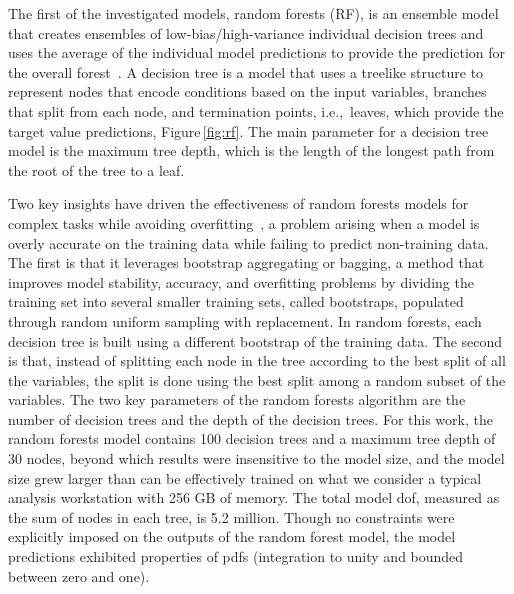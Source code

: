 \documentclass[review]{elsarticle}
\begin{document}
The first of the investigated models, random forests (RF), is an
ensemble model that creates ensembles of low-bias/high-variance
individual decision trees and uses the average of the individual model
predictions to provide the prediction for the overall
forest~\cite{Breiman2001}. A decision tree is a model that uses a
treelike structure to represent nodes that encode conditions based
on the input variables, branches that split from each node, and
termination points, i.e.,\ leaves, which provide the target value
predictions, Figure\,\ref{fig:rf}. The main parameter for a decision
tree model is the maximum tree depth, which is the length of the
longest path from the root of the tree to a leaf.

Two key insights have driven the effectiveness of random forests
models for complex tasks while avoiding
overfitting~\cite{Fernandez-Delgado2014,Liaw2002}, a problem arising
when a model is overly accurate on the training data while failing to
predict non-training data. The first is that it leverages bootstrap
aggregating or bagging, a method that improves model stability,
accuracy, and overfitting problems by dividing the training set into
several smaller training sets, called bootstraps, populated through
random uniform sampling with replacement. In random forests, each
decision tree is built using a different bootstrap of the training
data. The second is that, instead of splitting each node in the tree
according to the best split of all the variables, the split is done
using the best split among a random subset of the variables. The two
key parameters of the random forests algorithm are the number of
decision trees and the depth of the decision trees. For this work, the
random forests model contains 100 decision trees and a maximum tree
depth of 30 nodes, beyond which results were insensitive to the model
size, and the model size grew larger than can be effectively trained
on what we consider a typical analysis workstation with 256 GB of
memory. The total model \gls{dof}, measured as the sum of nodes in
each tree, is 5.2 million. Though no constraints were explicitly
imposed on the outputs of the random forest model, the model
predictions exhibited properties of \glspl{pdf} (integration to unity
and bounded between zero and one).
\end{document}
